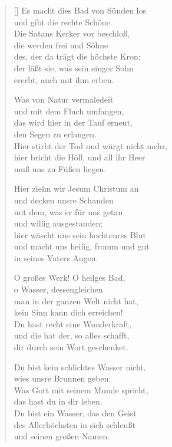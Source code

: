 \begin{multicols}{2}
\begin{verse}[\versewidth]
 Es macht dies Bad von Sünden los\\
und gibt die rechte Schöne.\\
Die Satans Kerker vor beschloß,\\
die werden frei und Söhne\\
des, der da trägt die höchste Kron;\\
der läßt sie, was sein einger Sohn\\
ererbt, auch mit ihm erben.

 Was von Natur vermaledeit\\
und mit dem Fluch umfangen,\\
das wird hier in der Tauf erneut,\\
den Segen zu erlangen.\\
Hier stirbt der Tod und würgt nicht mehr,\\
hier bricht die Höll, und all ihr Heer\\
muß uns zu Füßen liegen.

 Hier ziehn wir Jesum Christum an\\
und decken unsre Schanden\\
mit dem, was er für uns getan\\
und willig ausgestanden;\\
hier wäscht uns sein hochteures Blut\\
und macht uns heilig, fromm und gut\\
in seines Vaters Augen.

 O großes Werk! O heilges Bad,\\
o Wasser, dessengleichen\\
man in der ganzen Welt nicht hat,\\
kein Sinn kann dich erreichen!\\
Du hast recht eine Wunderkraft,\\
und die hat der, so alles schafft,\\
dir durch sein Wort geschenket.

 Du bist kein schlichtes Wasser nicht,\\
wies unsre Brunnen geben:\\
Was Gott mit seinem Munde spricht,\\
das hast du in dir leben.\\
Du bist ein Wasser, das den Geist\\
des Allerhöchsten in sich schleußt\\
und seinen großen Namen.


\end{verse}
\end{multicols}
